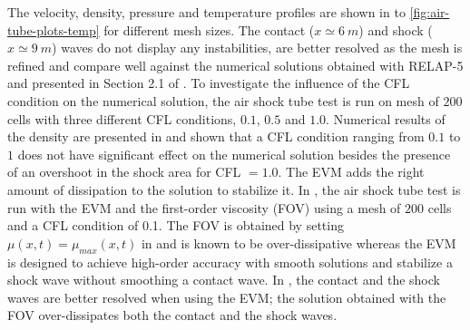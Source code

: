 \documentclass{inputs/mc2015}
\begin{document}
%
The velocity, density, pressure and temperature profiles are shown in  to \ref{fig:air-tube-plots-temp} for different mesh sizes. The contact ($x  \simeq 6 \ m$) and shock ($x  \simeq 9 \ m$) waves do not display any instabilities, are better resolved as the mesh is refined and compare well against the numerical solutions obtained with RELAP-5 and presented in Section 2.1 of \cite{Sokolowski-Koszela}. To investigate the influence of the CFL condition on the numerical solution, the air shock tube test is run on mesh of $200$ cells with three different CFL conditions, $0.1$, $0.5$ and $1.0$. Numerical results of the density are presented in  and shown that a CFL condition ranging from $0.1$ to $1$ does not have significant effect on the numerical solution besides the presence of an overshoot in the shock area for CFL $=1.0$. The EVM adds the right amount of dissipation to the solution to stabilize it. In , the air shock tube test is run with the EVM and the first-order viscosity (FOV) using a mesh of $200$ cells and a CFL condition of 0.1. The FOV is obtained by setting $\mu(x,t) = \mu_{max}(x,t)$ in  and is known to be over-dissipative whereas the EVM is designed to achieve high-order accuracy with smooth solutions and stabilize a shock wave without smoothing a contact wave. In , the contact and the shock waves are better resolved when using the EVM; the solution obtained with the FOV over-dissipates both the contact and the shock waves.
%
\end{document}
